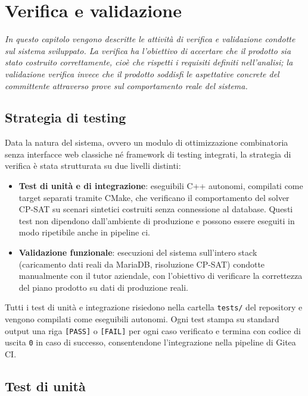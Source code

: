 \chapter{Verifica e validazione}
\label{chap:verifica-validazione}

\textit{In questo capitolo vengono descritte le attività di verifica e validazione condotte sul sistema sviluppato. La verifica ha l'obiettivo di accertare che il prodotto sia stato costruito correttamente, cioè che rispetti i requisiti definiti nell'analisi; la validazione verifica invece che il prodotto soddisfi le aspettative concrete del committente attraverso prove sul comportamento reale del sistema.}

\section{Strategia di testing}
\label{sec:strategia-testing}

Data la natura del sistema, ovvero un modulo di ottimizzazione combinatoria senza interfacce web classiche né framework di testing integrati, la strategia di verifica è stata strutturata su due livelli distinti:

\begin{itemize}
    \item \textbf{Test di unità e di integrazione}: eseguibili C++ autonomi, compilati come target separati tramite CMake, che verificano il comportamento del solver CP-SAT su scenari sintetici costruiti senza connessione al database. Questi test non dipendono dall'ambiente di produzione e possono essere eseguiti in modo ripetibile anche in pipeline \gls{ci}.
    \item \textbf{Validazione funzionale}: esecuzioni del sistema sull'intero stack (caricamento dati reali da MariaDB, risoluzione CP-SAT) condotte manualmente con il tutor aziendale, con l'obiettivo di verificare la correttezza del piano prodotto su dati di produzione reali.
\end{itemize}

Tutti i test di unità e integrazione risiedono nella cartella \texttt{tests/} del repository e vengono compilati come eseguibili autonomi. Ogni test stampa su standard output una riga \texttt{[PASS]} o \texttt{[FAIL]} per ogni caso verificato e termina con codice di uscita \texttt{0} in caso di successo, consentendone l'integrazione nella pipeline di Gitea CI.

\section{Test di unità}
\label{sec:test-unita}

